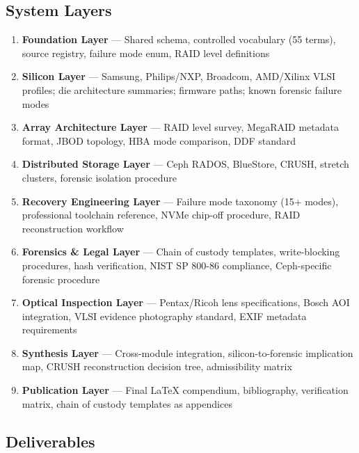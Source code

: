 \documentclass[11pt,letterpaper]{article}
\begin{document}
\subsection{System Layers}

\begin{enumerate}[leftmargin=*]
  \item \textbf{Foundation Layer} --- Shared schema, controlled vocabulary (55 terms), source registry, failure mode enum, RAID level definitions
  \item \textbf{Silicon Layer} --- Samsung, Philips/NXP, Broadcom, AMD/Xilinx VLSI profiles; die architecture summaries; firmware paths; known forensic failure modes
  \item \textbf{Array Architecture Layer} --- RAID level survey, MegaRAID metadata format, JBOD topology, HBA mode comparison, DDF standard
  \item \textbf{Distributed Storage Layer} --- Ceph RADOS, BlueStore, CRUSH, stretch clusters, forensic isolation procedure
  \item \textbf{Recovery Engineering Layer} --- Failure mode taxonomy (15+ modes), professional toolchain reference, NVMe chip-off procedure, RAID reconstruction workflow
  \item \textbf{Forensics \& Legal Layer} --- Chain of custody templates, write-blocking procedures, hash verification, NIST SP 800-86 compliance, Ceph-specific forensic procedure
  \item \textbf{Optical Inspection Layer} --- Pentax/Ricoh lens specifications, Bosch AOI integration, VLSI evidence photography standard, EXIF metadata requirements
  \item \textbf{Synthesis Layer} --- Cross-module integration, silicon-to-forensic implication map, CRUSH reconstruction decision tree, admissibility matrix
  \item \textbf{Publication Layer} --- Final LaTeX compendium, bibliography, verification matrix, chain of custody templates as appendices
\end{enumerate}

\subsection{Deliverables}
\end{document}
